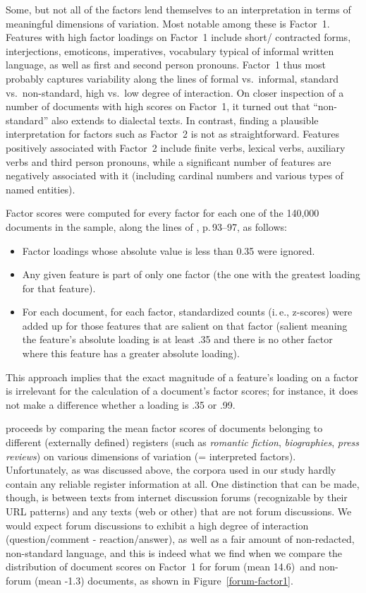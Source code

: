 Some, but not all of the factors lend themselves to an interpretation in terms of meaningful dimensions of variation.
Most notable among these is Factor~1.
Features with high factor loadings on Factor~1 include short/ contracted forms, interjections, emoticons, imperatives, vocabulary typical of informal written language, as well as first and second person pronouns.
Factor~1 thus most probably captures variability along the lines of formal vs.\ informal, standard vs.\ non-standard, high vs.\ low degree of interaction.
On closer inspection of a number of documents with high scores on Factor~1, it turned out that ``non-standard'' also extends to dialectal texts.
In contrast, finding a plausible interpretation for factors such as Factor~2 is not as straightforward.
Features positively associated with Factor~2 include finite verbs, lexical verbs, auxiliary verbs and third person pronouns, while a significant number of features are negatively associated with it (including cardinal numbers and various types of named entities).

Factor scores were computed for every factor for each one of the 140,000 documents in the sample, along the lines of \cite{Biber1988}, p.\,93--97, as follows:

\begin{itemize}
  \item Factor loadings whose absolute value is less than 0.35 were ignored.
  \item Any given feature is part of only one factor (the one with the greatest loading for that feature).
  \item For each document, for each factor, standardized counts (i.\,e., z-scores) were added up for those features that are salient on that factor (salient meaning the feature's absolute loading is at least .35 and there is no other factor where this feature has a greater absolute loading).
\end{itemize}

This approach implies that the exact magnitude of a feature's  loading on a factor is irrelevant for the calculation of a document's factor scores; for instance, it does not make a difference whether a loading is .35 or .99.

\cite{Biber1988} proceeds by comparing the mean factor scores of documents belonging to different (externally defined) registers (such as \textit{romantic fiction}, \textit{biographies}, \textit{press reviews}) on various dimensions of variation (= interpreted factors).
Unfortunately, as was discussed above, the corpora used in our study hardly contain any reliable register information at all.
One distinction that can be made, though, is between texts from internet discussion forums (recognizable by their URL patterns) and any texts (web or other) that are not forum discussions.
We would expect forum discussions to exhibit a high degree of interaction (question/comment - reaction/answer), as well as a fair amount of non-redacted, non-standard language, and this is indeed what we find when we compare the distribution of document scores on Factor~1 for forum (mean 14.6) and non-forum (mean -1.3) documents, as shown in Figure~\ref{forum-factor1}.

